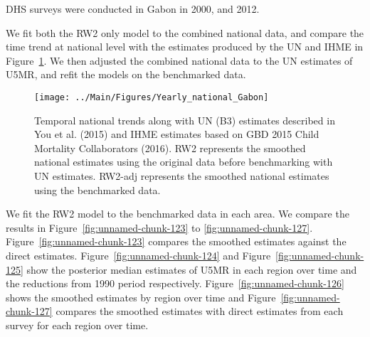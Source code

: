 \documentclass[12pt]{article}\usepackage[]{graphicx}\usepackage[]{color}
\newenvironment{knitrout}{}{} %
\begin{document}


DHS surveys were conducted in Gabon in 2000, and 2012.

We fit both the RW2 only model to the combined national data, and compare the time trend at national level with the estimates produced by the UN and IHME in Figure~\ref{fig:unnamed-chunk-122}. We then adjusted the combined national data to the UN estimates of U5MR, and refit the models on the benchmarked data. 

\begin{knitrout}
\color{fgcolor}\begin{figure}[bht]

{\centering \texttt{[image: ../Main/Figures/Yearly\_national\_Gabon]} 

}

\caption[Temporal national trends along with UN (B3) estimates described in You et al]{Temporal national trends along with UN (B3) estimates described in You et al. (2015) and IHME estimates based on GBD 2015 Child Mortality Collaborators (2016). RW2 represents the smoothed national estimates using the original data before benchmarking with UN estimates. RW2-adj represents the smoothed national estimates using the benchmarked data.}\label{fig:unnamed-chunk-122}
\end{figure}


\end{knitrout}
 

We fit the RW2 model to the benchmarked data in each area. 
We compare the results in Figure~\ref{fig:unnamed-chunk-123} to \ref{fig:unnamed-chunk-127}.
Figure~\ref{fig:unnamed-chunk-123} compares the smoothed estimates against the direct estimates. Figure~\ref{fig:unnamed-chunk-124} and Figure~\ref{fig:unnamed-chunk-125} show the posterior median estimates of U5MR in each region over time and the reductions from 1990 period respectively.
Figure~\ref{fig:unnamed-chunk-126} shows the smoothed estimates by region over time and Figure~\ref{fig:unnamed-chunk-127} compares the smoothed estimates with direct estimates from each survey for each region over time.


\end{document}
